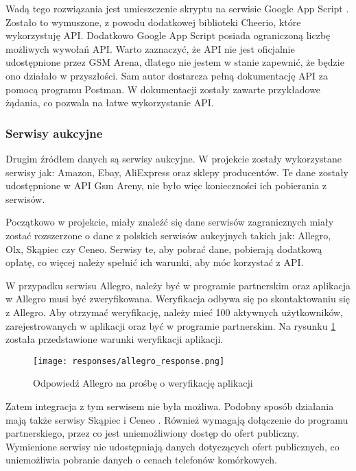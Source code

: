 Wadą tego rozwiązania jest umieszczenie skryptu na serwisie Google App Script \cite{google_app_script}. Zostało to wymuszone, z powodu dodatkowej biblioteki Cheerio, które wykorzystuję API. Dodatkowo Google App Script posiada ograniczoną liczbę możliwych wywołań API. Warto zaznaczyć, że API nie jest oficjalnie udostępnione przez GSM Arena, dlatego nie jestem w stanie zapewnić, że będzie ono działało w przyszłości. Sam autor dostarcza pełną dokumentację API za pomocą programu Postman. W dokumentacji \cite{gsm_arena_api_reference} zostały zawarte przykładowe żądania, co pozwala na łatwe wykorzystanie API.

\subsubsection{Serwisy aukcyjne}
Drugim źródłem danych są serwisy aukcyjne. W projekcie zostały wykorzystane serwisy jak: Amazon, Ebay, AliExpress oraz sklepy producentów. Te dane zostały udostępnione w API Gsm Areny, nie było więc konieczności ich pobierania z serwisów.

Początkowo w projekcie, miały znaleźć się dane serwisów zagranicznych miały zostać rozszerzone o dane z polskich serwisów aukcyjnych takich jak: Allegro, Olx, Skąpiec czy Ceneo. Serwisy te, aby pobrać dane, pobierają dodatkową opłatę, co więcej należy spełnić ich warunki, aby móc korzystać z API.

W przypadku serwisu Allegro, należy być w programie partnerskim oraz aplikacja w Allegro musi być zweryfikowana. Weryfikacja odbywa się po skontaktowaniu się z Allegro. Aby otrzymać weryfikację, należy mieć 100 aktywnych użytkowników, zarejestrowanych w aplikacji oraz być w programie partnerskim. Na rysunku \ref*{allegro_verification} została przedstawione warunki weryfikacji aplikacji.

\begin{figure}[H]
    \centering
    \texttt{[image: responses/allegro\_response.png]}
    \caption{Odpowiedź Allegro na prośbę o weryfikację aplikacji}
    \label{allegro_verification}
\end{figure}

Zatem integracja z tym serwisem nie była możliwa. Podobny sposób działania mają także serwisy Skąpiec \cite{skapiec} i Ceneo \cite{ceneo}. Również wymagają dołączenie do programu partnerskiego, przez co jest uniemożliwiony dostęp do ofert publiczny. Wymienione serwisy nie udostępniają danych dotyczących ofert publicznych, co uniemożliwia pobranie danych o cenach telefonów komórkowych.

